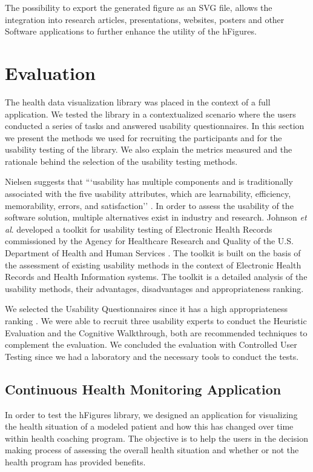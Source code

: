 \documentclass[twocolumn]{bmcart}%
\begin{document}
The possibility to export the generated figure as an SVG file, allows the integration into research articles, presentations, websites, posters and other Software applications to further enhance the utility of the hFigures.

\section*{Evaluation}

The health data visualization library was placed in the context of a full application. We tested the library in a contextualized scenario where the users conducted a series of tasks and answered usability questionnaires. In this section we present the methods we used for recruiting the participants and for the usability testing of the library. We also explain the metrics measured and the rationale behind the selection of the usability testing methods.

Nielsen suggests that ```usability has multiple components and is traditionally associated with the five usability attributes, which are learnability, efficiency, memorability, errors, and satisfaction'' \cite{nielsen1994usability}. In order to assess the usability of the software solution, multiple alternatives exist in industry and research. Johnson \textit{et al}. developed a toolkit for usability testing of Electronic Health Records commissioned by the Agency for Healthcare Research and Quality of the U.S. Department of Health and Human Services \cite{johnson2011ehr}. The toolkit is built on the basis of the assessment of existing usability methods in the context of Electronic Health Records and Health Information systems. The toolkit is a detailed analysis of the usability methods, their advantages, disadvantages and appropriateness ranking.

We selected the Usability Questionnaires since it has a high appropriateness ranking \cite{johnson2011ehr}. We were able to recruit three usability experts to conduct the Heuristic Evaluation and the Cognitive Walkthrough, both are recommended techniques to complement the evaluation. We concluded the evaluation with Controlled User Testing since we had a laboratory and the necessary tools to conduct the tests.

\subsection*{Continuous Health Monitoring Application}

In order to test the hFigures library, we designed an application for visualizing the health situation of a modeled patient and how this has changed over time within health coaching program. The objective is to help the users in the decision making process of assessing the overall health situation and whether or not the health program has provided benefits.
\end{document}
